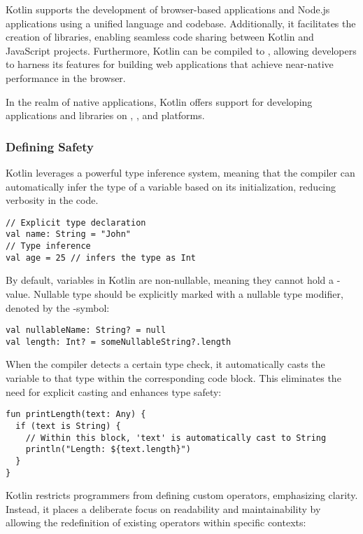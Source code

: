 Kotlin supports the development of browser-based applications and Node.js applications using a unified language and 
codebase. Additionally, it facilitates the creation of  libraries, enabling seamless code sharing between 
Kotlin and JavaScript projects. Furthermore, Kotlin can be compiled to , allowing developers to harness 
its features for building web applications that achieve near-native performance in the browser.

In the realm of native applications, Kotlin offers support for developing applications and libraries on , 
, and  platforms.


\newpage
\subsubsection{Defining Safety}

Kotlin leverages a powerful type inference system, meaning that the compiler can automatically infer the type of a 
variable based on its initialization, reducing verbosity in the code.

\begin{lstlisting}
// Explicit type declaration
val name: String = "John"
// Type inference
val age = 25 // infers the type as Int
\end{lstlisting}

\noindent By default, variables in Kotlin are non-nullable, meaning they cannot hold a -value. Nullable type 
should be explicitly marked with a nullable type modifier, denoted by the -symbol:

\begin{lstlisting}
val nullableName: String? = null
val length: Int? = someNullableString?.length
\end{lstlisting}

\noindent When the compiler detects a certain type check, it automatically casts the variable to that type within the 
corresponding code block. This eliminates the need for explicit casting and enhances type safety:

\begin{lstlisting}
fun printLength(text: Any) {
  if (text is String) {
    // Within this block, 'text' is automatically cast to String
    println("Length: ${text.length}")
  }
}
\end{lstlisting}

\noindent Kotlin restricts programmers from defining custom operators, emphasizing clarity. Instead, it places a 
deliberate focus on readability and maintainability by allowing the redefinition of existing operators within specific 
contexts:


